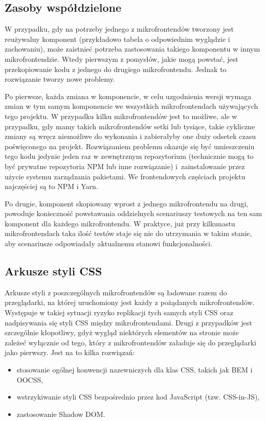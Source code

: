 \documentclass{SGGW-thesis}
\begin{document}
\subsection{Zasoby współdzielone}
W przypadku, gdy na potrzeby jednego z mikrofrontendów tworzony jest reużywalny komponent (przykładowo tabela o odpowiednim wyglądzie i zachowaniu), może zaistnieć potrzeba zastosowania takiego komponentu w innym mikrofrontendzie. Wtedy pierwszym z pomysłów, jakie mogą powstać, jest przekopiowanie kodu z jednego do drugiego mikrofrontendu. Jednak to rozwiązanie tworzy nowe problemy.

Po pierwsze, każda zmiana w komponencie, w celu uzgodnienia wersji wymaga zmian w tym samym komponencie we wszystkich mikrofrontendach używających tego projektu. W przypadku kilku mikrofrontendów jest to możliwe, ale w przypadku, gdy mamy takich mikrofrontendów setki lub tysiące, takie cykliczne zmiany są wręcz niemożliwe do wykonania i zabierałyby one duży odsetek czasu poświęconego na projekt.
Rozwiązaniem problemu okazuje się być umieszczeniu tego kodu jedynie jeden raz w zewnętrznym repozytorium (technicznie mogą to być prywatne repozytoria NPM lub inne rozwiązanie) i~zainstalowanie przez użycie systemu zarządzania pakietami. We frontendowych częściach projektu najczęściej są to NPM i Yarn.

Po drugie, komponent skopiowany wprost z jednego mikrofrontendu na drugi, powoduje konieczność powstawania oddzielnych scenariuszy testowych na ten sam komponent dla każdego mikrofrontendu. W praktyce, już przy kilkunastu mikrofrontendach taka ilość testów staje się nie do utrzymania w takim stanie, aby scenariusze odpowiadały aktualnemu stanowi funkcjonalności.

\subsection{Arkusze styli CSS}
Arkusze styli z poszczególnych mikrofrontendów są ładowane razem do przeglądarki, na której uruchomiony jest każdy z pożądanych mikrofrontendów. Występuje w takiej sytuacji ryzyko replikacji tych samych styli CSS oraz nadpisywania się styli CSS między mikrofrontendami. Drugi z przypadków jest szczególnie kłopotliwy, gdyż wygląd niektórych elementów na stronie może zależeć wyłącznie od tego, który z mikrofrontendów załaduje się do przeglądarki jako pierwszy. Jest na to kilka rozwiązań:

\begin{itemize}
	\item stosowanie ogólnej konwencji nazewniczych dla klas CSS, takich jak BEM i OOCSS,
	\item wstrzykiwanie styli CSS bezpośrednio przez kod JavaScript (tzw. CSS-in-JS),
	\item zastosowanie Shadow DOM.
\end{itemize}
\end{document}
